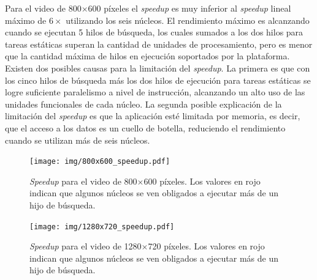 Para el video de 800$\times$600 píxeles el \emph{speedup} es muy inferior al
\emph{speedup} lineal máximo de $6\times$ utilizando los seis núcleos. El
rendimiento máximo es alcanzando cuando se ejecutan 5 hilos de búsqueda, los
cuales sumados a los dos hilos para tareas estáticas superan la cantidad de
unidades de procesamiento, pero es menor que la cantidad máxima de hilos en
ejecución soportados por la plataforma. Existen dos posibles causas para la
limitación del \emph{speedup}. La primera es que con los cinco hilos de búsqueda
más los dos hilos de ejecución para tareas estáticas se logre suficiente
paralelismo a nivel de instrucción, alcanzando un alto uso de las unidades
funcionales de cada núcleo. La segunda posible explicación de la limitación del
\emph{speedup} es que la aplicación esté limitada por memoria, es decir, que el
acceso a los datos es un cuello de botella, reduciendo el rendimiento cuando se
utilizan más de seis núcleos.

\begin{figure}[!htb]

	\texttt{[image: img/800x600\_speedup.pdf]}
	\caption{\emph{Speedup} para el video de 800$\times$600 píxeles. Los
	valores en rojo indican que algunos núcleos se ven obligados a ejecutar
	más de un hijo de búsqueda.}
	\label{speedUp800}

\end{figure}

\begin{figure}[!htb]

	\texttt{[image: img/1280x720\_speedup.pdf]}
	\caption{\emph{Speedup} para el video de 1280$\times$720 píxeles. Los
	valores en rojo indican que algunos núcleos se ven obligados a ejecutar
	más de un hijo de búsqueda.}

	\label{speedUp1280}

\end{figure}
